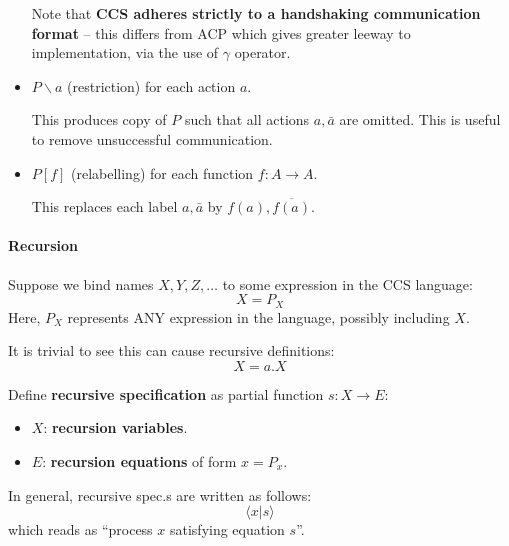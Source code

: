 \documentclass[99-notes-packed.tex]{subfiles}
\begin{document}
\begin{itemize}
{        Note that \textbf{CCS adheres strictly to a handshaking communication format} -- this differs from ACP which gives greater leeway to implementation, via the use of $\gamma$ operator.
    }
    \item {
        $P{\backslash}a$ (restriction) for each action $a$. 

        This produces copy of $P$ such that all actions $a, \bar{a}$ are omitted. This is useful to remove unsuccessful communication. 
    }
    \item {
        $P[f]$ (relabelling) for each function $f: A \rightarrow A$.

        This replaces each label $a, \bar{a}$ by $f(a), \overline{f(a)}$.
    }
\end{itemize}

\paragraph*{Recursion}
\begin{definition}
    Suppose we bind names $X, Y, Z, \dots$ to some expression in the CCS language: 
    \begin{equation*}
        X = P_X
    \end{equation*}
    Here, $P_X$ represents ANY expression in the language, possibly including $X$. 

    It is trivial to see this can cause recursive definitions: 
    \begin{equation*}
        X = a.X
    \end{equation*}
\end{definition}

\begin{definition}
    Define \textbf{recursive specification} as partial function $s: X \rightarrow E$: 
    \begin{itemize}
        \item $X$: \textbf{recursion variables}. 
        \item $E$: \textbf{recursion equations} of form $x = P_x$.
    \end{itemize}

    In general, recursive spec.s are written as follows: 
    \begin{equation*}
        \langle x | s \rangle
    \end{equation*}
    which reads as ``process $x$ satisfying equation $s$''. 
\end{definition}
\end{document}

